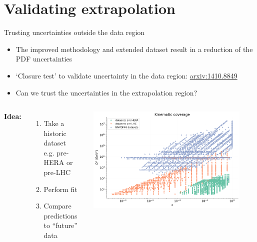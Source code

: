 \documentclass[aspectratio=169,10pt]{beamer}
\begin{document}
\section*{Validating extrapolation}

\begin{frame}{Trusting uncertainties outside the data region}

\begin{itemize}
        \item The improved methodology and extended dataset result in a reduction of the PDF uncertainties
        \item `Closure test' to validate uncertainty in the data region: \href{https://arxiv.org/abs/1410.8849}{\color{blue} arxiv:1410.8849}
        \item Can we trust the uncertainties in the extrapolation region?
\end{itemize}

\begin{columns}
    \textbf{Idea:}
    \begin{enumerate}
    \item Take a historic dataset \\ e.g. pre-HERA or pre-LHC
    \item Perform fit
    \item Compare predictions to ``future'' data
    \end{enumerate}

      \includegraphics[width=0.9\textwidth]{future_test/kincov}
\end{columns}
\end{frame}
\end{document}
